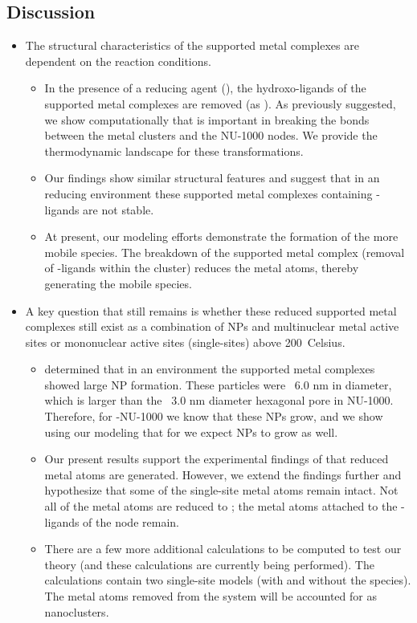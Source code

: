 \documentclass[journal=jctcce,manuscript=article]{achemso}
\begin{document}
\newpage
\subsection{Discussion}
\begin{itemize}
    \item The structural characteristics of the supported metal complexes are dependent on the reaction conditions.
    \begin{itemize}
        \item In the presence of a reducing agent (), the hydroxo-ligands of the supported metal complexes are removed (as ). As previously suggested, we show computationally that  is important in breaking the bonds between the metal clusters and the NU-1000 nodes. We provide the thermodynamic landscape for these transformations.
        \item Our findings show similar structural features and suggest that in an  reducing environment these supported metal complexes containing -ligands are not stable.  
        \item At present, our modeling efforts demonstrate the formation of the more mobile  species. The breakdown of the supported metal complex (removal of -ligands within the cluster) reduces the metal atoms, thereby generating the mobile  species.
    \end{itemize}
    \item A key question that still remains is whether these reduced supported metal complexes still exist as a combination of NPs and multinuclear metal active sites or mononuclear active sites (single-sites) above \SI{200}{Celsius}.
    \begin{itemize}
        \item \citeauthor{Halder2020} determined that in an  environment the  supported metal complexes showed large  NP formation. These particles were ~6.0 nm in diameter, which is larger than the ~3.0 nm diameter hexagonal pore in NU-1000. Therefore, for -NU-1000 we know that these NPs grow, and we show using our modeling that for  we expect  NPs to grow as well. 
        \item Our present results support the experimental findings of \citeauthor{Halder2020} that reduced metal atoms are generated. However, we extend the findings further and hypothesize that some of the single-site metal atoms remain intact. Not all of the metal atoms are reduced to ; the metal atoms attached to the -ligands of the node remain. 
        \item There are a few more additional calculations to be computed to test our theory (and these calculations are currently being performed). The calculations contain two single-site models (with and without the  species). The metal atoms removed from the system will be accounted for as nanoclusters.
    \end{itemize}
\end{itemize}
\end{document}
